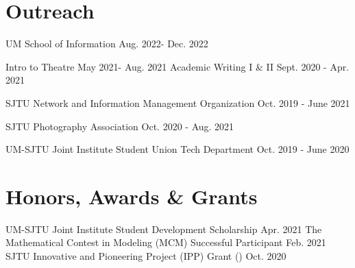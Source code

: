 

\section{\textbf{Outreach}}
\vspace{-0.4mm}
\resumeSubHeadingListStart
{} %
    {UM School of Information} %
    {Aug. 2022- Dec. 2022} %
        \vspace{-2mm}



    {Intro to Theatre} %
    {May 2021- Aug. 2021} %
        \vspace{-2mm}
    {Academic Writing I \& II} %
    {Sept. 2020 - Apr. 2021} %
        \vspace{-2mm}

    {SJTU Network and Information Management Organization}%
    {Oct. 2019 - June 2021} %
        \vspace{-2mm}  

    {SJTU Photography Association} %
    {Oct. 2020 - Aug. 2021} %
        \vspace{-2mm}  

    {UM-SJTU Joint Institute Student Union Tech Department} %
    {Oct. 2019 - June 2020} %
        \vspace{-2mm}  
        
\resumeSubHeadingListEnd
\vspace{-5mm}


\section{\textbf{Honors, Awards \& Grants}}
\vspace{-0.4mm}
\resumeSubHeadingListStart 

\resumePOR{} %
    {UM-SJTU Joint Institute Student Development Scholarship} %
    {Apr. 2021} %
        \vspace{-2mm}
\resumePOR{} %
    {The Mathematical Contest in Modeling (MCM) Successful Participant} %
    {Feb. 2021} %
        \vspace{-2mm}
\resumePOR{} %
{SJTU Innovative and Pioneering Project (IPP) Grant ()} %
    {Oct. 2020} %
        \vspace{-2mm}

